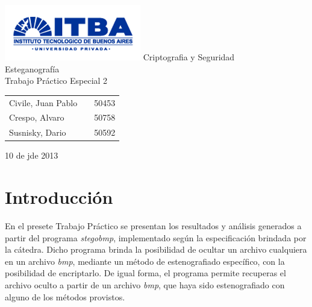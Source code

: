 \documentclass[a4paper,10pt]{article}
\begin{document}
\setcounter{secnumdepth}{5}
\setcounter{tocdepth}{5}

\begin{titlepage}
        \vfill
        \thispagestyle{empty}
        \begin{center}
                \includegraphics{./images/itba_logo.png}
                \vfill
                \Huge{Criptografia y Seguridad}\\
                \vspace{1cm}
                \Huge{Esteganografía}\\
                \vspace{1cm}
                \Huge{Trabajo Pr\'actico Especial 2}\\
        \end{center}
        \vfill
        \large{
        \begin{tabular}{lcr}
                Civile, Juan Pablo && 50453\\
                Crespo, Alvaro && 50758 \\
                Susnisky, Dario && 50592\\
        \end{tabular}
}
        \vspace{2cm}
        \begin{center}
                \large{10 de jde 2013}\\
        \end{center}
\end{titlepage}
\newpage

\setcounter{page}{1}

\section{Introducción}

En el presete Trabajo Práctico se presentan los resultados y análisis generados a partir del programa \textit{stegobmp}, implementado según la especificación
brindada por la cátedra. Dicho programa brinda la posibilidad de ocultar un archivo cualquiera en un archivo \textit{bmp}, mediante un método de estenografiado específico, 
con la posibilidad de encriptarlo. De igual forma, el programa permite recuperas el archivo oculto a partir de un archivo \textit{bmp}, que haya sido estenografiado con alguno 
de los métodos provistos.\\
\end{document}

